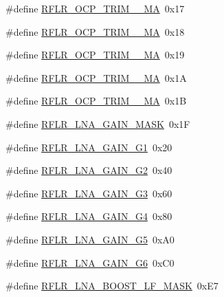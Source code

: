 \begin{DoxyCompactItemize}
\item 
\#define \mbox{\hyperlink{sx1276_regs-_lo_ra_8h_a1979c11cd7ce8b54355954a9e0139de6}{R\+F\+L\+R\+\_\+\+O\+C\+P\+\_\+\+T\+R\+I\+M\+\_\+\_\+\+MA}}~0x17
\item 
\#define \mbox{\hyperlink{sx1276_regs-_lo_ra_8h_a67bf750125a9cf6cc4137361236ad814}{R\+F\+L\+R\+\_\+\+O\+C\+P\+\_\+\+T\+R\+I\+M\+\_\+\_\+\+MA}}~0x18
\item 
\#define \mbox{\hyperlink{sx1276_regs-_lo_ra_8h_a3c729a06b76ddb3b25279ab9ec9759bf}{R\+F\+L\+R\+\_\+\+O\+C\+P\+\_\+\+T\+R\+I\+M\+\_\+\_\+\+MA}}~0x19
\item 
\#define \mbox{\hyperlink{sx1276_regs-_lo_ra_8h_a62fbdb1632a9ef8e2464a411ba6270ac}{R\+F\+L\+R\+\_\+\+O\+C\+P\+\_\+\+T\+R\+I\+M\+\_\+\_\+\+MA}}~0x1A
\item 
\#define \mbox{\hyperlink{sx1276_regs-_lo_ra_8h_a5b9df1b8ef5dd642212f2da58fff03e3}{R\+F\+L\+R\+\_\+\+O\+C\+P\+\_\+\+T\+R\+I\+M\+\_\+\_\+\+MA}}~0x1B
\item 
\#define \mbox{\hyperlink{sx1276_regs-_lo_ra_8h_adaf87cfb5bc1842f215a8905466c7c09}{R\+F\+L\+R\+\_\+\+L\+N\+A\+\_\+\+G\+A\+I\+N\+\_\+\+M\+A\+SK}}~0x1F
\item 
\#define \mbox{\hyperlink{sx1276_regs-_lo_ra_8h_a037aede58520e0ac15f5b63e9edef4fb}{R\+F\+L\+R\+\_\+\+L\+N\+A\+\_\+\+G\+A\+I\+N\+\_\+\+G1}}~0x20
\item 
\#define \mbox{\hyperlink{sx1276_regs-_lo_ra_8h_a20befb067e09b6a2f3768e8f0da43eec}{R\+F\+L\+R\+\_\+\+L\+N\+A\+\_\+\+G\+A\+I\+N\+\_\+\+G2}}~0x40
\item 
\#define \mbox{\hyperlink{sx1276_regs-_lo_ra_8h_accae2f3f70ca282fd61cb09a667901ba}{R\+F\+L\+R\+\_\+\+L\+N\+A\+\_\+\+G\+A\+I\+N\+\_\+\+G3}}~0x60
\item 
\#define \mbox{\hyperlink{sx1276_regs-_lo_ra_8h_a6d72851174c6d7664136736589055129}{R\+F\+L\+R\+\_\+\+L\+N\+A\+\_\+\+G\+A\+I\+N\+\_\+\+G4}}~0x80
\item 
\#define \mbox{\hyperlink{sx1276_regs-_lo_ra_8h_ae5719825fa402e40336c7acac639c5db}{R\+F\+L\+R\+\_\+\+L\+N\+A\+\_\+\+G\+A\+I\+N\+\_\+\+G5}}~0x\+A0
\item 
\#define \mbox{\hyperlink{sx1276_regs-_lo_ra_8h_aa16933aa89f284c5c3e9c3700d717902}{R\+F\+L\+R\+\_\+\+L\+N\+A\+\_\+\+G\+A\+I\+N\+\_\+\+G6}}~0x\+C0
\item 
\#define \mbox{\hyperlink{sx1276_regs-_lo_ra_8h_ace13d78a7979a589c7b3918412bb7140}{R\+F\+L\+R\+\_\+\+L\+N\+A\+\_\+\+B\+O\+O\+S\+T\+\_\+\+L\+F\+\_\+\+M\+A\+SK}}~0x\+E7
\item 

\end{DoxyCompactItemize}
